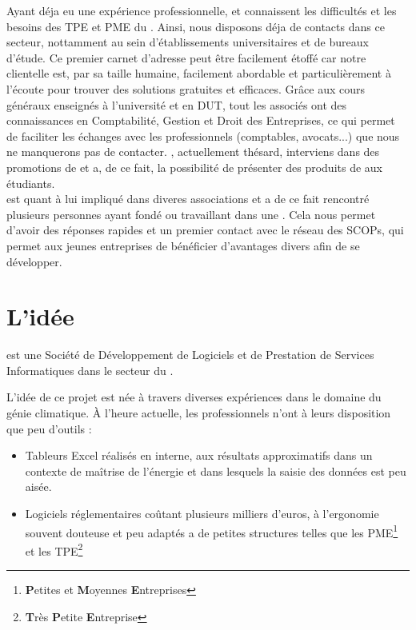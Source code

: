 		Ayant déja eu une expérience professionnelle, \bonte{} et \ben{} connaissent les difficultés et les besoins des TPE et PME du \gHabitat{}.
		Ainsi, nous disposons déja de contacts dans ce secteur,
		nottamment au sein d'établissements universitaires et de bureaux d'étude.
		Ce premier carnet d'adresse peut être facilement étoffé car notre clientelle est,
		par sa taille humaine, facilement abordable et particulièrement à l'écoute pour trouver des solutions gratuites et efficaces.
		Grâce aux cours généraux enseignés à l'université et en DUT, 
		tout les associés ont des connaissances en Comptabilité, Gestion et Droit des Entreprises,
		ce qui permet de faciliter les échanges avec les professionnels (comptables, avocats...) que nous ne manquerons pas de contacter.
		\bonte, actuellement thésard, interviens dans des promotions de \gHabitat{} et a, 
		de ce fait, la possibilité de présenter des produits de \K{} aux étudiants. \\
		\clem{} est quant à lui impliqué dans diveres associations et a de ce fait rencontré plusieurs personnes ayant fondé ou travaillant dans une . Cela nous permet d'avoir des réponses rapides et un premier contact avec le réseau des SCOPs, qui permet aux jeunes entreprises de bénéficier d'avantages divers afin de se développer.


	\section{L'idée}
		\K{} est une Société de Développement de Logiciels et de Prestation de Services Informatiques dans le secteur du \gHabitat{}.

		L'idée de ce projet est née à travers diverses expériences dans le domaine du génie climatique.
		À l'heure actuelle, les professionnels n'ont à leurs disposition que peu d'outils : 
		\begin{itemize}
			\item Tableurs Excel réalisés en interne, aux résultats approximatifs dans un contexte de maîtrise de l'énergie
				et dans lesquels la saisie des données est peu aisée.
			\item Logiciels réglementaires coûtant plusieurs milliers d'euros, à l'ergonomie souvent douteuse et peu adaptés a de petites structures telles que les PME\footnote{\textbf{P}etites et \textbf{M}oyennes \textbf{E}ntreprises} et les TPE\footnote{\textbf{T}rès \textbf{P}etite \textbf{E}ntreprise}
		\end{itemize}
		
